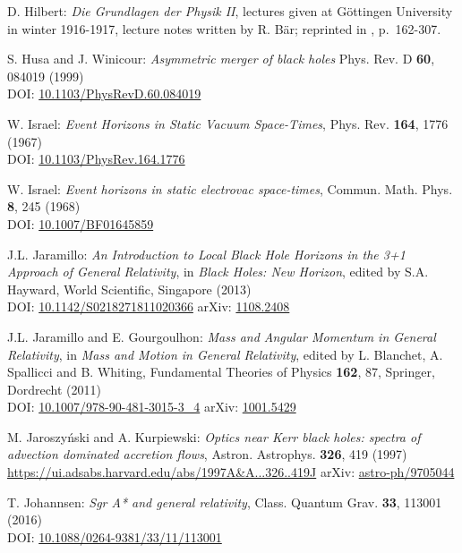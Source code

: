 \begin{thebibliography}{123}
D. Hilbert:
{\em Die Grundlagen der Physik II},
lectures given at Göttingen University in winter 1916-1917,
lecture notes written by R. Bär; reprinted
in \cite{SauerM09}, p.~162-307.

S. Husa and J. Winicour:
{\em Asymmetric merger of black holes}
Phys. Rev. D {\bf 60}, 084019 (1999)\\
DOI: \href{https://doi.org/10.1103/PhysRevD.60.084019}{10.1103/PhysRevD.60.084019}

W. Israel: {\em Event Horizons in Static Vacuum Space-Times},
Phys. Rev. {\bf 164}, 1776 (1967)\\
DOI: \href{https://doi.org/10.1103/PhysRev.164.1776}{10.1103/PhysRev.164.1776}

W. Israel: {\em Event horizons in static electrovac space-times},
Commun. Math. Phys. {\bf 8}, 245 (1968)\\
DOI: \href{https://doi.org/10.1007/BF01645859}{10.1007/BF01645859}

J.L. Jaramillo: {\em An Introduction to Local Black Hole Horizons in the 3+1
Approach of General Relativity}, in {\em Black Holes: New Horizon}, edited
by S.A. Hayward, World Scientific, Singapore (2013)\\
DOI: \href{https://doi.org/10.1142/S0218271811020366}{10.1142/S0218271811020366}\hfill
arXiv: \href{https://arxiv.org/abs/1108.2408}{1108.2408}

J.L. Jaramillo and E. Gourgoulhon:
{\em Mass and Angular Momentum in General Relativity},
in \emph{Mass and Motion in General Relativity}, edited by L. Blanchet, A. Spallicci and B. Whiting, Fundamental Theories of Physics {\bf 162}, 87,
Springer, Dordrecht (2011) \\
DOI: \href{https://doi.org/10.1007/978-90-481-3015-3_4}{10.1007/978-90-481-3015-3\_4}\hfill
arXiv: \href{https://arxiv.org/abs/1001.5429}{1001.5429}

M. Jaroszy\'nski and A. Kurpiewski:
{\em Optics near Kerr black holes: spectra of advection dominated accretion flows},
Astron. Astrophys. {\bf 326}, 419 (1997)\\
\url{https://ui.adsabs.harvard.edu/abs/1997A&A...326..419J}\hfill
arXiv: \href{https://arxiv.org/abs/astro-ph/9705044}{astro-ph/9705044}

T. Johannsen:
{\em Sgr A* and general relativity},
Class. Quantum Grav.  {\bf 33}, 113001 (2016)\\
DOI: \href{https://doi.org/10.1088/0264-9381/33/11/113001}{10.1088/0264-9381/33/11/113001}


\end{thebibliography}

